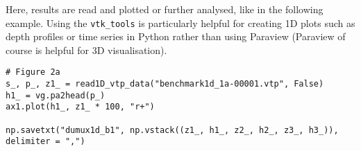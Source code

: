 Here, results are read and plotted or further analysed, like in the following example. 
Using the \lstinline{vtk_tools} is particularly helpful for creating 1D plots such as depth profiles or time series in Python rather than using Paraview (Paraview of course is helpful for 3D visualisation).  

\begin{lstlisting}
# Figure 2a
s_, p_, z1_ = read1D_vtp_data("benchmark1d_1a-00001.vtp", False)
h1_ = vg.pa2head(p_)
ax1.plot(h1_, z1_ * 100, "r+")

np.savetxt("dumux1d_b1", np.vstack((z1_, h1_, z2_, h2_, z3_, h3_)), delimiter = ",")
\end{lstlisting}